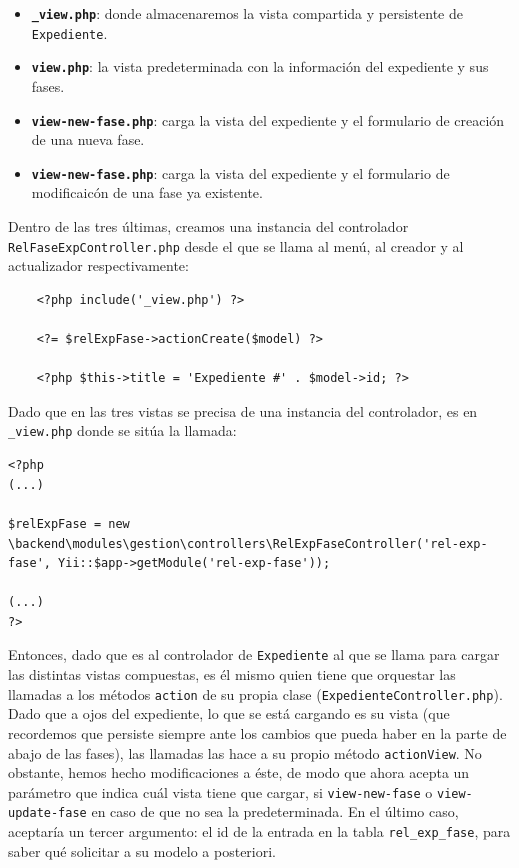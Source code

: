 \begin{itemize}
	\item \textbf{\texttt{\_view.php}}: donde almacenaremos la vista compartida y persistente de \texttt{Expediente}.
	\item \textbf{\texttt{view.php}}: la vista predeterminada con la información del expediente y sus fases.
	\item \textbf{\texttt{view-new-fase.php}}: carga la vista del expediente y el formulario de creación de una nueva fase.
	\item \textbf{\texttt{view-new-fase.php}}: carga la vista del expediente y el formulario de modificaicón de una fase ya existente.
\end{itemize}

Dentro de las tres últimas, creamos una instancia del controlador \texttt{RelFaseExpController.php} desde el que se llama al menú, al creador y al actualizador respectivamente:

\begin{verbatim}
	<?php include('_view.php') ?>
	
	<?= $relExpFase->actionCreate($model) ?>
	
	<?php $this->title = 'Expediente #' . $model->id; ?>
\end{verbatim}

Dado que en las tres vistas se precisa de una instancia del controlador, es en \texttt{\_view.php} donde se sitúa la llamada:

\begin{verbatim}
<?php
(...)

$relExpFase = new \backend\modules\gestion\controllers\RelExpFaseController('rel-exp-fase', Yii::$app->getModule('rel-exp-fase'));

(...)
?>
\end{verbatim}

Entonces, dado que es al controlador de \texttt{Expediente} al que se llama para cargar las distintas vistas compuestas, es él mismo quien tiene que orquestar las llamadas a los métodos \texttt{action} de su propia clase (\texttt{ExpedienteController.php}). Dado que a ojos del expediente, lo que se está cargando es su vista (que recordemos que persiste siempre ante los cambios que pueda haber en la parte de abajo de las fases), las llamadas las hace a su propio método \texttt{actionView}. No obstante, hemos hecho modificaciones a éste, de modo que ahora acepta un parámetro que indica cuál vista tiene que cargar, si \texttt{view-new-fase} o \texttt{view-update-fase} en caso de que no sea la predeterminada. En el último caso, aceptaría un tercer argumento: el id de la entrada en la tabla \texttt{rel\_exp\_fase}, para saber qué solicitar a su modelo a posteriori.


